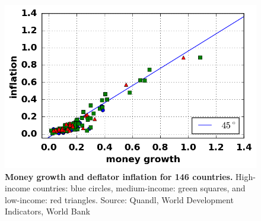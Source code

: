 \begin{figure}[h]
\caption{\label{fig_moneyInflationOpen} \textbf{Money growth and deflator inflation for 146 countries.} High-income countries: blue circles, medium-income: green squares, and low-income: red triangles. {\tiny Source: Quandl, World Development Indicators, World Bank}}
\hspace*{-.5cm}\includegraphics[height = 7.cm]{./png/fig_moneyInflationOpen.png}
\end{figure}
